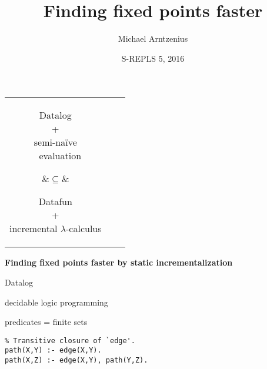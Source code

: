 \documentclass{beamer}
\title{Finding fixed points faster}
\author{Michael Arntzenius}
\institute{University of Birmingham}
\date{S-REPLS 5, 2016}
\begin{document}
\maketitle

\begin{frame}
  \huge
  \begin{center}
    \begin{tabular}{ccc}
      \parbox{4cm}{
        \begin{center}
           Datalog\\ +\\
           semi-na\"ive\\\ \ evaluation
        \end{center}}
      &{\Huge $\subseteq$}&
      \parbox{4cm}{
        \begin{center}
           Datafun\\ +\\
           incremental $\lambda$-calculus
        \end{center}
      }
    \end{tabular}
  \end{center}
\end{frame}


\begin{frame}
  \huge\centering\bf Finding fixed points faster by static incrementalization
\end{frame}



\begin{frame}
  \Huge \centering Datalog\vspace{0.66cm}

  \huge decidable logic programming\vspace{0.66cm}

  predicates = finite sets
\end{frame}

\begin{frame}[fragile]
  \Large
  \begin{center}
\begin{verbatim}
% Transitive closure of `edge'.
path(X,Y) :- edge(X,Y).
path(X,Z) :- edge(X,Y), path(Y,Z).
\end{verbatim}
  \end{center}
\end{frame}
\end{document}
